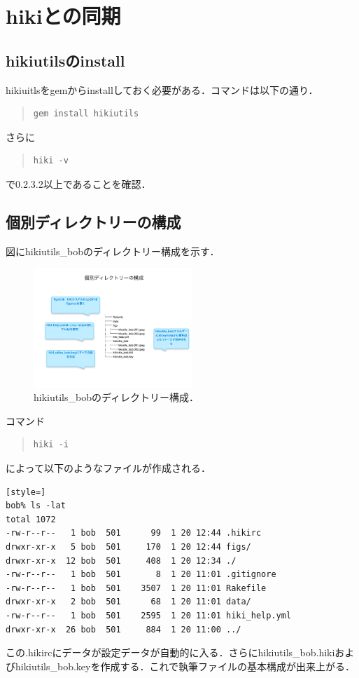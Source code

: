 \section{hikiとの同期}
\subsection{hikiutilsのinstall}
hikiuitlsをgemからinstallしておく必要がある．コマンドは以下の通り．
\begin{quote}\begin{verbatim}
gem install hikiutils
\end{verbatim}\end{quote}
さらに
\begin{quote}\begin{verbatim}
hiki -v
\end{verbatim}\end{quote}
で0.2.3.2以上であることを確認．

\subsection{個別ディレクトリーの構成}
図にhikiutils\_bobのディレクトリー構成を示す．

\begin{figure}[htbp]\begin{center}
\includegraphics[width=6cm,bb=0 0 442 432]{../figs/./hikiutils_bob.003.jpeg}
\caption{hikiutils\_bobのディレクトリー構成．}
\label{default}\end{center}\end{figure}
コマンド
\begin{quote}\begin{verbatim}
hiki -i
\end{verbatim}\end{quote}
によって以下のようなファイルが作成される．
\begin{lstlisting}[style=]
bob% ls -lat
total 1072
-rw-r--r--   1 bob  501      99  1 20 12:44 .hikirc
drwxr-xr-x   5 bob  501     170  1 20 12:44 figs/
drwxr-xr-x  12 bob  501     408  1 20 12:34 ./
-rw-r--r--   1 bob  501       8  1 20 11:01 .gitignore
-rw-r--r--   1 bob  501    3507  1 20 11:01 Rakefile
drwxr-xr-x   2 bob  501      68  1 20 11:01 data/
-rw-r--r--   1 bob  501    2595  1 20 11:01 hiki_help.yml
drwxr-xr-x  26 bob  501     884  1 20 11:00 ../
\end{lstlisting}
この.hikircにデータが設定データが自動的に入る．さらにhikiutils\_bob.hikiおよびhikiutils\_bob.keyを作成する．これで執筆ファイルの基本構成が出来上がる．

